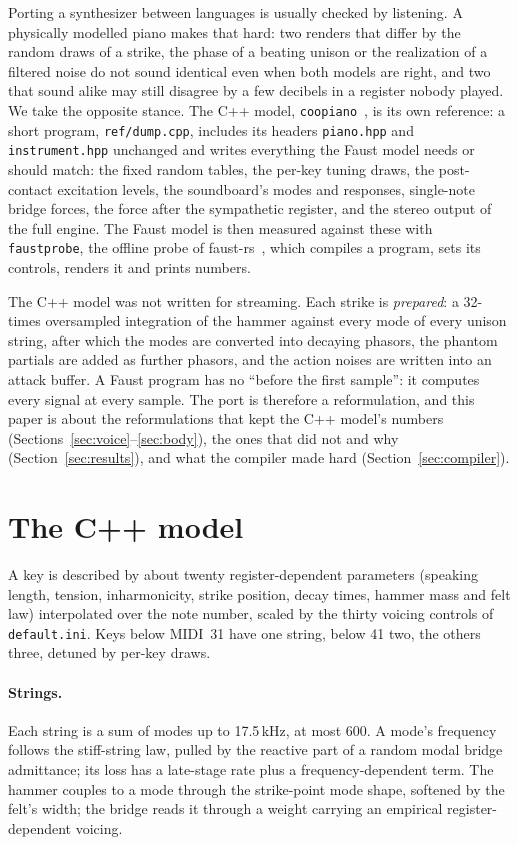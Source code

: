\documentclass[10pt,a4paper,twocolumn]{article}
\newcommand{\faustrs}{faust-rs}
\newcommand{\probe}{\texttt{faustprobe}}
\newcommand{\coop}{\texttt{coopiano}}
\newcommand{\code}[1]{\texttt{#1}}
\begin{document}
Porting a synthesizer between languages is usually checked by listening. A physically modelled piano makes that hard: two renders that differ by the random draws of a strike, the phase of a beating unison or the realization of a filtered noise do not sound identical even when both models are right, and two that sound alike may still disagree by a few decibels in a register nobody played. We take the opposite stance. The C++ model, \coop{}~\cite{coopiano}, is its own reference: a short program, \code{ref/dump.cpp}, includes its headers \code{piano.hpp} and \code{instrument.hpp} unchanged and writes everything the Faust model needs or should match: the fixed random tables, the per-key tuning draws, the post-contact excitation levels, the soundboard's modes and responses, single-note bridge forces, the force after the sympathetic register, and the stereo output of the full engine. The Faust model is then measured against these with \probe{}, the offline probe of \faustrs{}~\cite{faustrs}, which compiles a program, sets its controls, renders it and prints numbers.

The C++ model was not written for streaming. Each strike is \emph{prepared}: a 32-times oversampled integration of the hammer against every mode of every unison string, after which the modes are converted into decaying phasors, the phantom partials are added as further phasors, and the action noises are written into an attack buffer. A Faust program has no ``before the first sample'': it computes every signal at every sample. The port is therefore a reformulation, and this paper is about the reformulations that kept the C++ model's numbers (Sections~\ref{sec:voice}--\ref{sec:body}), the ones that did not and why (Section~\ref{sec:results}), and what the compiler made hard (Section~\ref{sec:compiler}).

\section{The C++ model}
\label{sec:model}

A key is described by about twenty register-dependent parameters (speaking length, tension, inharmonicity, strike position, decay times, hammer mass and felt law) interpolated over the note number, scaled by the thirty voicing controls of \code{default.ini}. Keys below MIDI~31 have one string, below 41 two, the others three, detuned by per-key draws.

\paragraph{Strings.} Each string is a sum of modes up to 17.5\,kHz, at most 600. A mode's frequency follows the stiff-string law, pulled by the reactive part of a random modal bridge admittance; its loss has a late-stage rate plus a frequency-dependent term. The hammer couples to a mode through the strike-point mode shape, softened by the felt's width; the bridge reads it through a weight carrying an empirical register-dependent voicing.
\end{document}
